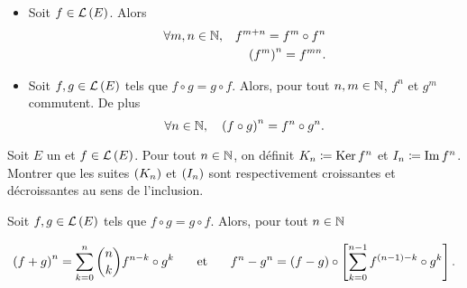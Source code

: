 \documentclass{magnolia}
\begin{document}
\begin{proposition}
\begin{itemize}
\item Soit $f\in\mathcal{L}\left(E\right)$. Alors
\begin{eqnarray*}
\forall m,n\in\mathbb{N}, & & f^{m+n}=f^m\circ f^n\\
                 & & \left(f^m\right)^n=f^{mn}.
\end{eqnarray*}
\item Soit $f,g\in \mathcal{L}\left(E\right)$ tels que $f\circ g=g\circ f$. Alors, pour tout $n,m\in\mathbb{N}$, $f^n$ et $g^m$ commutent. De plus
\[\forall n\in\mathbb{N} ,\quad \left(f\circ g\right)^n=f^n \circ g^n.\]
\end{itemize}
\end{proposition}

\begin{exoUnique}
  \exo Soit $E$ un \Kev et $f\in\mathcal{L}\left(E\right)$. Pour tout $n\in\mathbb{N}$, on définit
    $K_n\coloneqq\mathop{\rm Ker} f^n$ et $I_n\coloneqq\operatorname{Im} f^n$. Montrer que les suites $\left(K_n\right)$ et
    $\left(I_n\right)$ sont respectivement croissantes et décroissantes au sens de
    l'inclusion.
  \end{exoUnique}

\begin{proposition}
  Soit $f,g\in\mathcal{L}\left(E\right)$ tels que $f\circ g=g\circ f$.
  Alors, pour tout $n\in\mathbb{N}$

    \[\left(f+g\right)^n = \sum_{k=0}^n \binom{n}{k} f^{n-k} \circ g^k \quad\quad\!\text{et}\quad\!\quad
      f^n-g^n=\left(f-g\right)\circ\left[\sum_{k=0}^{n-1} f^{\left(n-1\right)-k}\circ g^k\right].\]
  \end{proposition}







\end{document}
